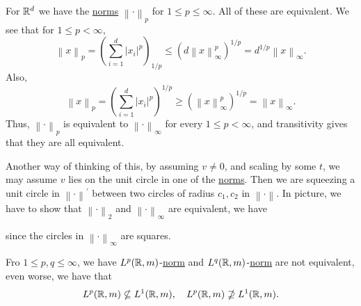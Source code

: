 \begin{eg}
	For \(\mathbb{\MakeUppercase{r}} ^d\) we have the \hyperref[def:norm]{norms} \(\left\lVert \cdot\right\rVert _p\) for \(1\leq p\leq \infty \). All of these are equivalent. We see that for \(1\leq p<\infty \),
	\[
		\left\lVert x\right\rVert _p = \left(\sum\limits_{i=1}^{d} \left\vert x_{i}  \right\vert^p \right)_{1 / p} \leq (d \left\lVert x\right\rVert _\infty ^p)^{1 / p} = d^{1 / p} \left\lVert x\right\rVert _\infty .
	\]
	Also,
	\[
		\left\lVert x\right\rVert _p = \left(\sum\limits_{i=1}^{d} \left\vert x_{i} \right\vert^p \right)^{1 / p} \geq \left(\left\lVert x\right\rVert ^p _\infty \right)^{1 / p} = \left\lVert x\right\rVert _\infty .
	\]
	Thus, \(\left\lVert \cdot\right\rVert _p\) is equivalent to \(\left\lVert \cdot\right\rVert _\infty \) for every \(1 \leq p < \infty \), and transitivity gives that they are all equivalent.

	Another way of thinking of this, by assuming \(v\neq 0\), and scaling by some \(t\), we may assume \(v\) lies on the unit circle in one of the \hyperref[def:norm]{norms}. Then we are squeezing a unit circle
	in \(\left\lVert \cdot\right\rVert ^\prime \) between two circles of radius \(c_1, c_2\) in \(\left\lVert \cdot\right\rVert \). In picture, we have to show that \(\left\lVert \cdot\right\rVert _2\) and
	\(\left\lVert \cdot\right\rVert _\infty \) are equivalent, we have
	\begin{figure}[H]
		\centering
	\end{figure}
	since the circles in \(\left\lVert \cdot\right\rVert _\infty \) are squares.
\end{eg}

\begin{eg}
	Fro \(1\leq p, q\leq \infty \), we have \(L^p(\mathbb{\MakeUppercase{r}} , m)\)-\hyperref[def:norm]{norm} and \(L^q(\mathbb{\MakeUppercase{r}} , m)\)-\hyperref[def:norm]{norm} are not equivalent, even worse,
	we have that
	\[
		L^p(\mathbb{\MakeUppercase{r}} , m)\nsubseteq L^1(\mathbb{\MakeUppercase{r}} , m),\quad L^p(\mathbb{\MakeUppercase{r}} , m)\nsupseteq L^1(\mathbb{\MakeUppercase{r}} , m).
	\]
\end{eg}
